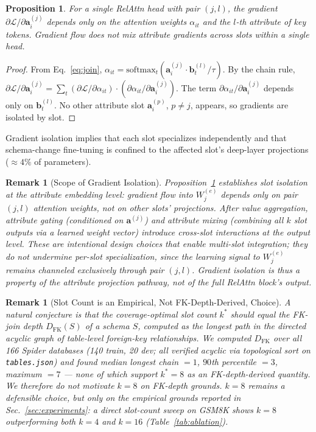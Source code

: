 \documentclass[review]{elsarticle}
\newtheorem{proposition}[theorem]{Proposition}
\newtheorem{remark}[theorem]{Remark}
\newcommand{\softmax}{\mathrm{softmax}}
\begin{document}
\begin{proposition}
\label{prop:gradient}
For a single RelAttn head with pair $(j,l)$, the gradient $\partial\mathcal{L}/\partial \mathbf{a}^{(j)}_i$ depends only on the attention weights $\alpha_{it}$ and the $l$-th attribute of key tokens. Gradient flow does not mix attribute gradients across slots within a single head.
\end{proposition}

\begin{proof}
	\renewcommand{\qedsymbol}{}
From Eq.~\eqref{eq:join}, $\alpha_{it} = \softmax_t(\mathbf{a}_i^{(j)} \cdot \mathbf{b}_t^{(l)} / \tau)$. By the chain rule, $\partial \mathcal{L}/\partial \mathbf{a}^{(j)}_i = \sum_t (\partial \mathcal{L}/\partial \alpha_{it}) \cdot (\partial \alpha_{it}/\partial \mathbf{a}^{(j)}_i)$. The term $\partial \alpha_{it}/\partial \mathbf{a}^{(j)}_i$ depends only on $\mathbf{b}_t^{(l)}$. No other attribute slot $\mathbf{a}^{(p)}_i$, $p \neq j$, appears, so gradients are isolated by slot.
\end{proof}

Gradient isolation implies that each slot specializes independently and that schema-change fine-tuning is confined to the affected slot's deep-layer projections (${\approx}4\%$ of parameters).

\begin{remark}[Scope of Gradient Isolation]
\label{rem:gradient_scope}
Proposition~\ref{prop:gradient} establishes slot isolation at the \emph{attribute embedding} level: gradient flow into $W_j^{(e)}$ depends only on pair $(j,l)$ attention weights, not on other slots' projections. After value aggregation, attribute gating (conditioned on $\mathbf{a}^{(j)}$) and attribute mixing (combining all $k$ slot outputs via a learned weight vector) introduce cross-slot interactions at the \emph{output} level. These are intentional design choices that enable multi-slot integration; they do not undermine per-slot specialization, since the learning signal to $W_j^{(e)}$ remains channeled exclusively through pair $(j,l)$. Gradient isolation is thus a property of the attribute \emph{projection} pathway, not of the full RelAttn block's output.
\end{remark}

\begin{remark}[Slot Count is an Empirical, Not FK-Depth-Derived, Choice]
\label{rem:kchoice}
A natural conjecture is that the coverage-optimal slot count $k^*$ should equal the FK-join depth $D_{\mathrm{FK}}(S)$ of a schema $S$, computed as the longest path in the directed acyclic graph of table-level foreign-key relationships. We computed $D_{\mathrm{FK}}$ over all 166 Spider databases (140 train, 20 dev; all verified acyclic via topological sort on \texttt{tables.json}) and found median longest chain $=1$, $90$th percentile $=3$, maximum $=7$ --- none of which support $k^*{=}8$ as an FK-depth-derived quantity. We therefore do not motivate $k{=}8$ on FK-depth grounds. $k{=}8$ remains a defensible choice, but only on the empirical grounds reported in Sec.~\ref{sec:experiments}: a direct slot-count sweep on GSM8K shows $k{=}8$ outperforming both $k{=}4$ and $k{=}16$ (Table~\ref{tab:ablation}).
\end{remark}
\end{document}
